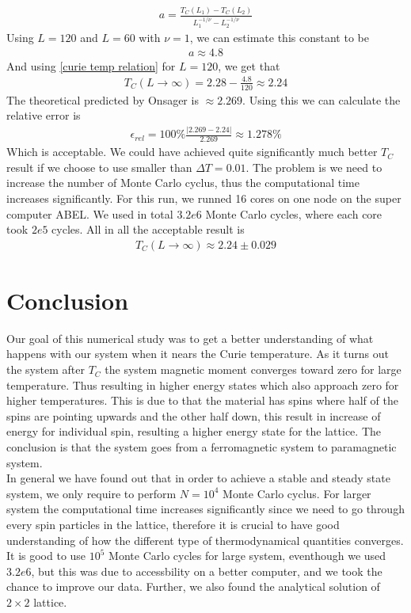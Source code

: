 \documentclass[a4paper, 10pt]{article}
\begin{document}
\begin{align}
    a = \frac{T_{C}(L_{1}) - T_{C}(L_{2})}{L_{1}^{-1/\nu}-L_{2}^{-1/\nu}}
\end{align}
Using $L = 120$ and $L = 60$ with $\nu = 1$, we can estimate this constant to be
\begin{align}
  a \approx 4.8
\end{align}
And using \eqref{curie temp relation} for $L = 120$, we get that
\begin{align}
  T_{C}(L \to \infty) = 2.28- \frac{4.8}{120} \approx 2.24
\end{align}
The theoretical predicted by Onsager is $\approx 2.269$. Using this we can calculate the relative error is
\begin{align}
  \epsilon_{rel} = 100\%\frac{|2.269-2.24|}{2.269} \approx 1.278\%
\end{align}
Which is acceptable. We could have achieved quite significantly much better $T_{C}$ result if we choose to use smaller than $\Delta T = 0.01$.
The problem is we need to increase the number of Monte Carlo cyclus, thus the computational time increases significantly. For this run, we runned
16 cores on one node on the super computer ABEL. We used in total $3.2e6$ Monte Carlo cycles, where each core took $2e5$ cycles. All in all the acceptable result is
\begin{align}
    T_{C}(L \to \infty) \approx 2.24 \pm 0.029
\end{align}
\section{Conclusion}
Our goal of this numerical study was to get a better understanding of what happens with our system when it nears
the Curie temperature. As it turns out the system after $T_{C}$ the system magnetic moment converges toward zero for large temperature. Thus resulting in
higher energy states which also approach zero for higher temperatures. This is due to that the material has spins where half of the spins are pointing upwards and the other half down,
this result in increase of energy for individual spin, resulting a higher energy state for the lattice. The conclusion is that the system goes from
a ferromagnetic system to paramagnetic system.
\vspace{3mm}
\\
In general we have found out that in order to achieve a stable and steady state system, we only require to perform
$N = 10^{4}$ Monte Carlo cyclus. For larger system the computational time increases significantly since we need to go through every
spin particles in the lattice, therefore it is crucial to have good understanding of how the different type of thermodynamical quantities converges.
It is good to use $10^{5}$ Monte Carlo cycles for large system, eventhough we used $3.2e6$, but this was due to
accessbility on a better computer, and we took the chance to improve our data. Further, we also found the analytical solution of
$2\times 2$ lattice.


\newpage
\end{document}
